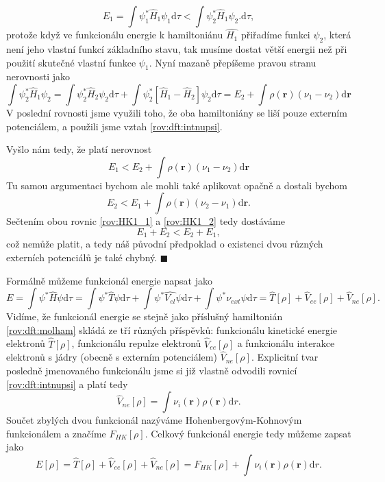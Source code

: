 \begin{equation}
E_1 = \int \psi_1^* \hat{H}_1 \psi_1 \mathrm{d}\tau < \int \psi_2^* \hat{H}_1 \psi_2 . \mathrm{d}\tau ,
\end{equation}
protože když ve funkcionálu energie k hamiltoniánu $\hat{H_1}$ přiřadíme funkci $\psi_2$, která není jeho vlastní funkcí základního stavu, tak musíme dostat větší energii než při použití skutečné vlastní funkce $\psi_1$. Nyní mazaně přepíšeme pravou stranu nerovnosti jako  
\begin{equation}
\int \psi_2^* \hat{H}_1 \psi_2 = \int \psi_2^* \hat{H}_2 \psi_2\mathrm{d}\tau  + \int \psi_2^* \left[\hat{H}_1-\hat{H}_2\right] \psi_2\mathrm{d}\tau = E_2 + \int \rho(\mathbf{r})(\nu_1-\nu_2)\mathrm{d}\mathbf{r}  
\end{equation}
V poslední rovnosti jsme využili toho, že oba hamiltoniány se liší pouze externím potenciálem, a použili jsme vztah \eqref{rov:dft:intnupsi}.

\noindent Vyšlo nám tedy, že platí nerovnost
\begin{equation}
E_1 < E_2+\int \rho(\mathbf{r})(\nu_1-\nu_2)\mathrm{d}\mathbf{r}
\label{rov:HK1_1}
\end{equation}
Tu samou argumentaci bychom ale mohli také aplikovat opačně a dostali bychom
\begin{equation}
E_2 < E_1+\int \rho(\mathbf{r})(\nu_2-\nu_1)\mathrm{d}\mathbf{r} .
\label{rov:HK1_2}
\end{equation}
Sečtením obou rovnic \eqref{rov:HK1_1} a \eqref{rov:HK1_2} tedy dostáváme
\begin{equation}
E_1 + E_2 < E_2 + E_1 ,
\end{equation}
což nemůže platit, a tedy náš původní předpoklad o existenci dvou různých externích potenciálů je také chybný.
\hfill {\footnotesize $\blacksquare$}

Formálně můžeme funkcionál energie napsat jako
\begin{equation}
E=\int \psi^*\hat{H}\psi \mathrm{d}\tau = \int \psi^*\hat{T}\psi\mathrm{d}\tau + \int \psi^*\hat{V_{el}}\psi\mathrm{d}\tau + \int \psi^*\nu_{ext}\psi\mathrm{d}\tau=\hat{T}[\rho]+\hat{V}_{ee}[\rho]+\hat{V}_{ne}[\rho] .
\end{equation}
Vidíme, že funkcionál energie se stejně jako příslušný hamiltonián \eqref{rov:dft:molham} skládá ze tří různých příspěvků: funkcionálu kinetické energie elektronů $\hat{T}[\rho]$, funkcionálu repulze elektronů $\hat{V}_{ee}[\rho]$ a funkcionálu interakce elektronů s jádry (obecně s externím potenciálem) $\hat{V}_{ne}[\rho]$. 
Explicitní tvar posledně jmenovaného funkcionálu jsme si již vlastně odvodili rovnicí \eqref{rov:dft:intnupsi} a platí tedy
\begin{equation}
\hat{V}_{ne}[\rho] = \int \nu_i(\textbf{r})\rho(\textbf{r}) \mathrm{d}r .
\end{equation}
Součet zbylých dvou funkcionál nazýváme Hohenbergovým-Kohnovým funkcionálem a značíme $F_{HK}[\rho]$. 
Celkový funkcionál energie tedy můžeme zapsat jako
\begin{equation}
E[\rho] = \hat{T}[\rho]+\hat{V}_{ee}[\rho]+\hat{V}_{ne}[\rho] = F_{HK}[\rho] + \int \nu_i(\mathbf{r})\rho(\textbf{r}) \mathrm{d}r .
\end{equation}

